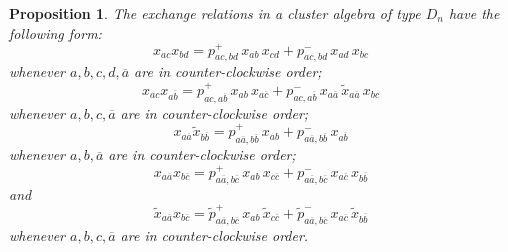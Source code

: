 \documentclass[letterpaper]{amsart}
\numberwithin{equation}{section}
\newtheorem{proposition}[theorem]{Proposition}
\theoremstyle{definition}
\def\Poly{\mathbf{P}}
\begin{document}
\begin{proposition} 
\label{pr:exchanges-D} 
The exchange relations in a cluster algebra of type $D_n$ 
have the following form: 
\begin{equation} 
\label{eq:exchange-relation-D-1} 
x_{ac} x_{bd} = 
p^+_{ac,bd}\, 
x_{ab}\, x_{cd} 
+ 
p^-_{ac,bd}\, 
x_{ad}\, x_{bc} 
\end{equation} 
whenever $a,b,c,d,\overline a$ are %
in counter-clockwise order; 
\begin{equation} 
\label{eq:exchange-relation-D-2} 
x_{ac} x_{a \overline b} = 
p^+_{ac,a \overline b}\, 
x_{ab}\, x_{a \overline c} 
+ 
p^-_{ac,a\overline b}\, 
x_{a \overline a}  \, \tilde x_{a \overline a} \, x_{bc} 
\end{equation} 
whenever $a,b,c,\overline a$ are %
in counter-clockwise order; 
\begin{equation} 
\label{eq:exchange-relation-D-3} 
x_{a\overline a} \tilde x_{b \overline b} = 
p^+_{a\overline a,b \overline b}\, x_{ab} 
+ 
p^-_{a\overline a,b\overline b}\, 
x_{a \overline b} 
\end{equation} 
whenever $a,b,\overline a$ are %
in counter-clockwise order; 
\begin{equation} 
\label{eq:exchange-relation-D-4} 
x_{a \overline a} x_{b \overline c} = 
p^+_{a \overline a,b \overline c}\, 
x_{ab}\, x_{c \overline c} 
+ 
p^-_{a \overline a,b \overline c}\, 
x_{a \overline c}  \,  x_{b \overline b} 
\end{equation} 
and 
\begin{equation} 
\label{eq:exchange-relation-D-5} 
\tilde x_{a \overline a} x_{b \overline c} = 
\tilde p^+_{a \overline a,b \overline c}\, 
x_{ab}\, \tilde x_{c \overline c} 
+ 
\tilde p^-_{a \overline a,b \overline c}\, 
x_{a \overline c}  \, \tilde x_{b \overline b} 
\end{equation} 
whenever $a,b,c,\overline a$ are %
in counter-clockwise order. 
\end{proposition} 
 
\end{document}
